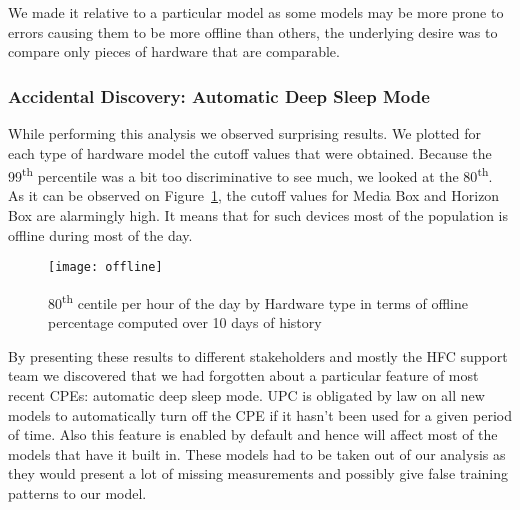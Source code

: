 We made it relative to a particular model as some models may be more prone to errors causing them to be more offline than others, the underlying desire was to compare only pieces of hardware that are comparable. 

\subsubsection{Accidental Discovery: Automatic Deep Sleep Mode}
While performing this analysis we observed surprising results. We plotted for each type of hardware model the cutoff values that were obtained. Because the 99\textsuperscript{th} percentile was a bit too discriminative to see much, we looked at the 80\textsuperscript{th}. As it can be observed on Figure~\ref{offline}, the cutoff values for Media Box and Horizon Box are alarmingly high. It means that for such devices most of the population is offline during most of the day. 

\begin{figure}[ht]
    \begin{center}
    \texttt{[image: offline]}
    \end{center}
    \caption{80\textsuperscript{th} centile per hour of the day by Hardware type in terms of offline percentage computed over 10 days of history}
    \label{offline}
\end{figure}

By presenting these results to different stakeholders and mostly the HFC support team we discovered that we had forgotten about a particular feature of most recent CPEs: automatic deep sleep mode. UPC is obligated by law on all new models to automatically turn off the CPE if it hasn't been used for a given period of time. Also this feature is enabled by default and hence will affect most of the models that have it built in. These models had to be taken out of our analysis as they would present a lot of missing measurements and possibly give false training patterns to our model.

